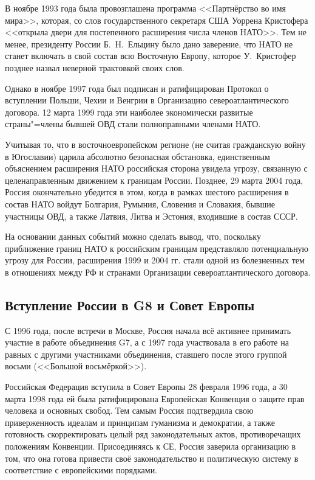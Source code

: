В ноябре 1993 года была провозглашена программа  <<Партнёрство во имя мира>>, которая, со слов государственного секретаря США Уоррена Кристофера <<открыла двери для постепенного расширения числа членов НАТО>>. Тем не менее, президенту России Б.~Н.~Ельцину было дано заверение, что НАТО не станет включать в свой состав всю Восточную Европу, которое У.~Кристофер позднее назвал неверной трактовкой своих слов. 

Однако в ноябре 1997 года был подписан и ратифицирован Протокол о вступлении Польши, Чехии и Венгрии в Организацию североатлантического договора. 12 марта 1999 года эти наиболее экономически развитые страны"=члены бывшей ОВД стали полноправными членами НАТО.

Учитывая то, что в восточноевропейском регионе (не считая гражданскую войну в Югославии) царила абсолютно безопасная обстановка, единственным объяснением расширения НАТО российская сторона увидела угрозу, связанную с целенаправленным движением к границам России. Позднее, 29 марта 2004 года, Россия окончательно убедится в этом, когда в рамках шестого расширения в состав НАТО войдут Болгария, Румыния, Словения и Словакия, бывшие участницы ОВД, а также Латвия, Литва и Эстония, входившие в состав СССР.

На основании данных событий можно сделать вывод, что, поскольку приближение границ НАТО к российским границам представляло потенциальную угрозу для России, расширения 1999 и 2004 гг. стали одной из болезненных тем в отношениях между РФ и странами Организации североатлантического договора.
\subsection{Вступление России в G8 и Совет Европы}
С 1996 года, после встречи в Москве, Россия начала всё активнее принимать участие в работе объединения G7, а с 1997 года участвовала в его работе на равных с другими участниками объединения, ставшего после этого группой восьми (<<Большой восьмёркой>>).

Российская Федерация вступила в Совет Европы 28 февраля 1996 года, а 30 марта 1998 года ей была ратифицирована Европейская Конвенция о защите прав человека и основных свобод. Тем самым Россия подтвердила свою приверженность идеалам и принципам гуманизма и демократии, а также готовность скорректировать целый ряд законодательных актов, противоречащих положениям Конвенции. Присоединяясь к СЕ, Россия заверила организацию в том, что она готова привести своё законодательство и политическую систему в соответствие с европейскими порядками.
